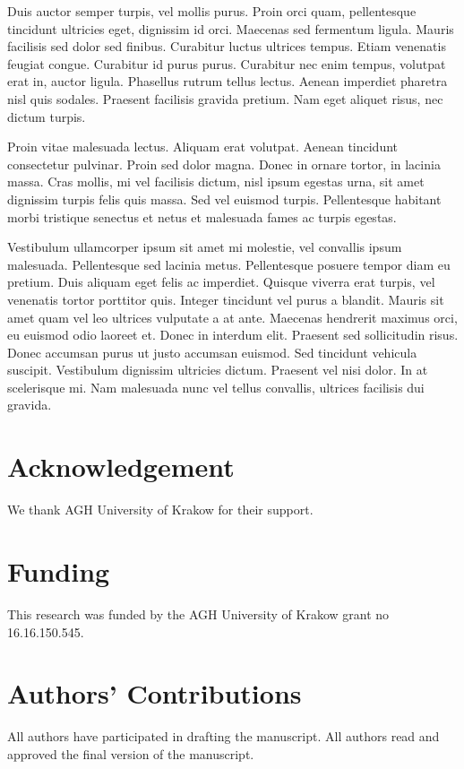 \documentclass[a4paper]{article}
\begin{document}
\begin{multicols}{2}
Duis auctor semper turpis, vel mollis purus. Proin orci quam, pellentesque tincidunt ultricies eget, dignissim id orci. Maecenas sed fermentum ligula. Mauris facilisis sed dolor sed finibus. Curabitur luctus ultrices tempus. Etiam venenatis feugiat congue. Curabitur id purus purus. Curabitur nec enim tempus, volutpat erat in, auctor ligula. Phasellus rutrum tellus lectus. Aenean imperdiet pharetra nisl quis sodales. Praesent facilisis gravida pretium. Nam eget aliquet risus, nec dictum turpis.

Proin vitae malesuada lectus. Aliquam erat volutpat. Aenean tincidunt consectetur pulvinar. Proin sed dolor magna. Donec in ornare tortor, in lacinia massa. Cras mollis, mi vel facilisis dictum, nisl ipsum egestas urna, sit amet dignissim turpis felis quis massa. Sed vel euismod turpis. Pellentesque habitant morbi tristique senectus et netus et malesuada fames ac turpis egestas.

Vestibulum ullamcorper ipsum sit amet mi molestie, vel convallis ipsum malesuada. Pellentesque sed lacinia metus. Pellentesque posuere tempor diam eu pretium. Duis aliquam eget felis ac imperdiet. Quisque viverra erat turpis, vel venenatis tortor porttitor quis. Integer tincidunt vel purus a blandit. Mauris sit amet quam vel leo ultrices vulputate a at ante. Maecenas hendrerit maximus orci, eu euismod odio laoreet et. Donec in interdum elit. Praesent sed sollicitudin risus. Donec accumsan purus ut justo accumsan euismod. Sed tincidunt vehicula suscipit. Vestibulum dignissim ultricies dictum. Praesent vel nisi dolor. In at scelerisque mi. Nam malesuada nunc vel tellus convallis, ultrices facilisis dui gravida. 

\section*{Acknowledgement}
We thank AGH University of Krakow for their support.

\section*{Funding}
This research was funded by the AGH University of Krakow grant no 16.16.150.545.

\section*{Authors' Contributions}
All authors have participated in drafting the manuscript. All authors read and approved the final version of the manuscript.


\end{multicols}
\end{document}
